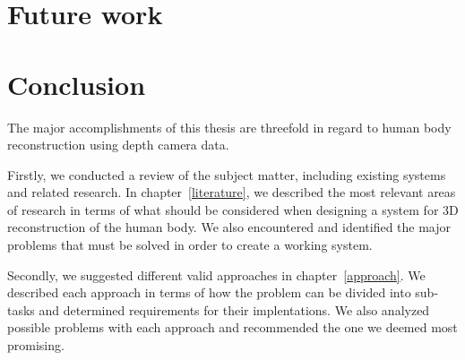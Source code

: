 
\section{Future work}


\section{Conclusion}

The major accomplishments of this thesis are threefold in regard to human body reconstruction using depth camera data.

Firstly, we conducted a review of the subject matter, including existing systems and related research. In chapter~\ref{literature}, we described the most relevant areas of research in terms of what should be considered when designing a system for 3D reconstruction of the human body. We also encountered and identified the major problems that must be solved in order to create a working system.

Secondly, we suggested different valid approaches in chapter~\ref{approach}. We described each approach in terms of how the problem can be divided into sub-tasks and determined requirements for their implentations. We also analyzed possible problems with each approach and recommended the one we deemed most promising.

